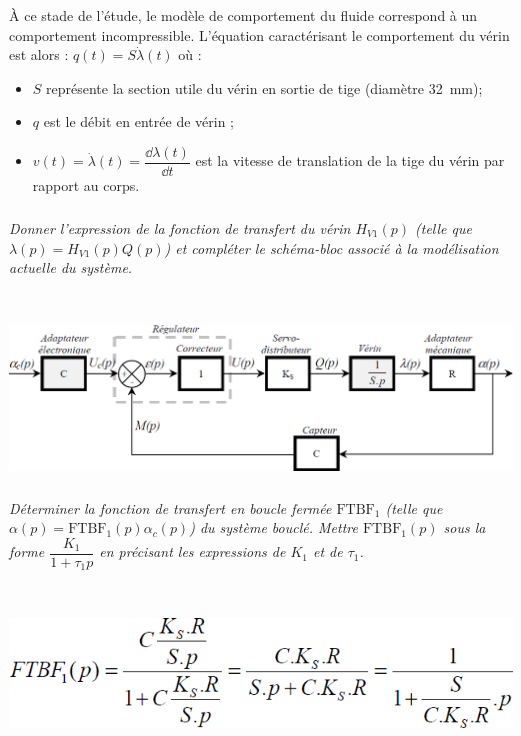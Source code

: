 \begin{multicols}{2}
\begin{multicols}{2}
À ce stade de l'étude, le modèle de comportement du fluide correspond à un comportement incompressible. L'équation caractérisant le comportement du vérin est alors : $q(t)=S\dot{\lambda}(t)$ où :
\begin{itemize}
\item $S$ représente la section utile du vérin en sortie de tige (diamètre \SI{32}{mm});
\item $q$ est le débit en entrée de vérin ;
\item $v(t)=\dot{\lambda}(t)=\dfrac{\dd \lambda(t) }{\dd t}$ est la vitesse de translation de la tige du vérin par rapport au corps.
\end{itemize}
% 

\subparagraph{}\textit{Donner l'expression de la fonction de transfert du vérin $H_{V1}(p)$ (telle que $\lambda(p) = H_{V1}(p) Q(p)$) et compléter le schéma-bloc associé à la modélisation actuelle du système.}
\ifprof
\begin{corrige} ~\\

\begin{center}
\includegraphics[width=.95\linewidth]{images/cor_01}
\end{center}
\end{corrige}
\else
\fi

\subparagraph{}\textit{Déterminer la fonction de transfert en boucle fermée $\text{FTBF}_1$ (telle que $\alpha(p) = \text{FTBF}_1(p) \alpha_c(p)$) du système bouclé. Mettre  $\text{FTBF}_1(p)$ sous la forme 
$\dfrac{K_1}{1+\tau_1 p}$ en précisant les expressions de $K_1$ et de $\tau_1$.} 
 \ifprof
\begin{corrige} ~\\

\begin{center}
\includegraphics[width=.95\linewidth]{images/cor_02}
\end{center}
\end{corrige}
\else
\fi



\end{multicols}
\end{multicols}
